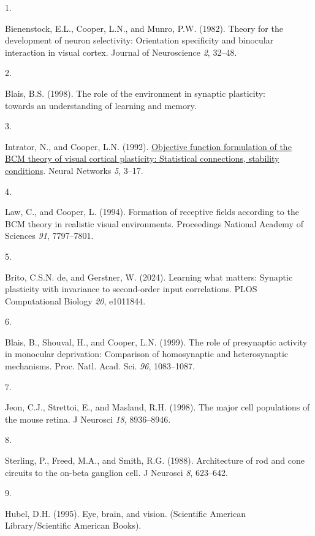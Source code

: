 \documentclass[
]{article}
\newlength{\cslhangindent}
\newlength{\csllabelwidth}
\newenvironment{CSLReferences}[2] %
 {\begin{list}{}{%
  \setlength{\itemindent}{0pt}
  \setlength{\leftmargin}{0pt}
  \setlength{\parsep}{0pt}
  \ifodd #1
   \setlength{\leftmargin}{\cslhangindent}
   \setlength{\itemindent}{-1\cslhangindent}
  \fi
  \setlength{\itemsep}{#2\baselineskip}}}
 {\end{list}}
\newcommand{\CSLLeftMargin}[1]{\parbox[t]{\csllabelwidth}{\strut#1\strut}}
\newcommand{\CSLRightInline}[1]{\parbox[t]{\linewidth - \csllabelwidth}{\strut#1\strut}}
\begin{document}
\label{refs}
\begin{CSLReferences}{0}{1}
\CSLLeftMargin{1. }%
\CSLRightInline{Bienenstock, E.L., Cooper, L.N., and Munro, P.W. (1982).
Theory for the development of neuron selectivity: Orientation
specificity and binocular interaction in visual cortex. Journal of
Neuroscience \emph{2}, 32--48.}

\CSLLeftMargin{2. }%
\CSLRightInline{Blais, B.S. (1998). The role of the environment in
synaptic plasticity:\\
towards an understanding of learning and memory.}

\CSLLeftMargin{3. }%
\CSLRightInline{Intrator, N., and Cooper, L.N. (1992).
\href{ftp://cns.brown.edu/nin/papers/cooper.ps.Z}{Objective function
formulation of the {BCM} theory of visual cortical plasticity:
Statistical connections, stability conditions}. Neural Networks
\emph{5}, 3--17.}

\CSLLeftMargin{4. }%
\CSLRightInline{Law, C., and Cooper, L. (1994). Formation of receptive
fields according to the {BCM} theory in realistic visual environments.
Proceedings National Academy of Sciences \emph{91}, 7797--7801.}

\CSLLeftMargin{5. }%
\CSLRightInline{Brito, C.S.N. de, and Gerstner, W. (2024). Learning what
matters: Synaptic plasticity with invariance to second-order input
correlations. PLOS Computational Biology \emph{20}, e1011844.}

\CSLLeftMargin{6. }%
\CSLRightInline{Blais, B., Shouval, H., and Cooper, L.N. (1999). The
role of presynaptic activity in monocular deprivation: Comparison of
homosynaptic and heterosynaptic mechanisms. Proc. Natl. Acad. Sci.
\emph{96}, 1083--1087.}

\CSLLeftMargin{7. }%
\CSLRightInline{Jeon, C.J., Strettoi, E., and Masland, R.H. (1998). {The
major cell populations of the mouse retina}. J Neurosci \emph{18},
8936--8946.}

\CSLLeftMargin{8. }%
\CSLRightInline{Sterling, P., Freed, M.A., and Smith, R.G. (1988).
{Architecture of rod and cone circuits to the on-beta ganglion cell}. J
Neurosci \emph{8}, 623--642.}

\CSLLeftMargin{9. }%
\CSLRightInline{Hubel, D.H. (1995). Eye, brain, and vision. (Scientific
American Library/Scientific American Books).}


\end{CSLReferences}
\end{document}
